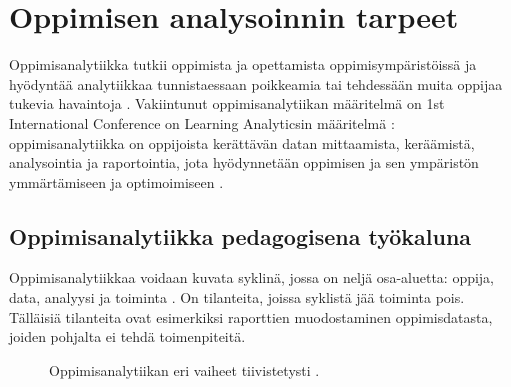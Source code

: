 \chapter{Oppimisen analysoinnin tarpeet\label{oppimisenanalysoinnintarpeet}}

Oppimisanalytiikka tutkii oppimista ja opettamista oppimisympäristöissä ja hyödyntää analytiikkaa tunnistaessaan poikkeamia tai tehdessään muita oppijaa tukevia havaintoja \citep{longPenetratingFogAnalytics2011}. Vakiintunut oppimisanalytiikan määritelmä on 1st International Conference on Learning Analyticsin määritelmä \citep{siemensLearningAnalyticsEmergence2013}: oppimisanalytiikka on oppijoista kerättävän datan mittaamista, keräämistä, analysointia ja raportointia, jota hyödynnetään oppimisen ja sen ympäristön ymmärtämiseen ja optimoimiseen \citep{clowLearningAnalyticsCycle2012}.


\section{Oppimisanalytiikka pedagogisena työkaluna}

Oppimisanalytiikkaa voidaan kuvata syklinä, jossa on neljä osa-aluetta: oppija, data, analyysi ja toiminta \citep{clowLearningAnalyticsCycle2012}. On tilanteita, joissa syklistä jää toiminta pois. Tälläisiä tilanteita ovat esimerkiksi raporttien muodostaminen oppimisdatasta, joiden pohjalta ei tehdä toimenpiteitä.

\begin{figure}[h]
    \centering
    \caption{Oppimisanalytiikan eri vaiheet tiivistetysti \citep{clowLearningAnalyticsCycle2012}.}
\end{figure}

